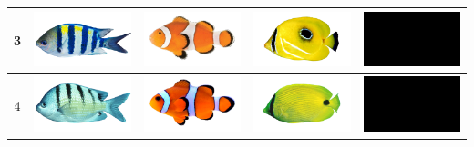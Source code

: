 \begin{longtable}{|c|c|c|c|c|}
    3 & \includegraphics[width=3cm]{gambar/abudefduf/A3} & \includegraphics[width=3cm]{gambar/amphiprion/A3} & \includegraphics[width=3cm]{gambar/chaetodon/C3} & \includegraphics[width=3cm]{gambar/negative_examples/N3} \\
    \hline
    4 & \includegraphics[width=3cm]{gambar/abudefduf/A4} & \includegraphics[width=3cm]{gambar/amphiprion/A4} & \includegraphics[width=3cm]{gambar/chaetodon/C4} & \includegraphics[width=3cm]{gambar/negative_examples/N4} \\
    \hline

\end{longtable}
